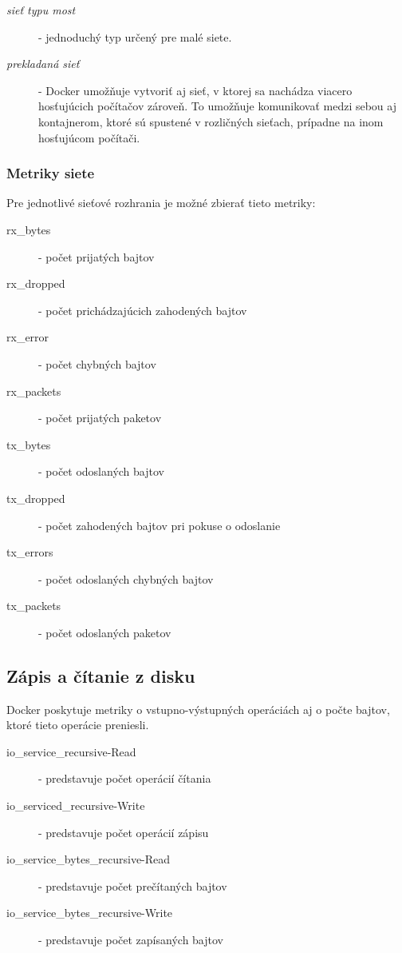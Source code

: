 \documentclass[printed,11pt,twoside,color,cover,table]{fithesis3}
\begin{document}
\begin{description}
\item[\emph{sieť typu most}] - jednoduchý typ určený pre malé siete.
\item[\emph{prekladaná sieť}] - Docker umožňuje vytvoriť aj sieť, v ktorej sa nachádza viacero hosťujúcich počítačov zároveň. To umožňuje 
komunikovať medzi sebou aj kontajnerom, ktoré sú spustené v rozličných sieťach, prípadne na inom hosťujúcom počítači.
\end{description}

\subsubsection{Metriky siete}
Pre jednotlivé sieťové rozhrania je možné zbierať tieto metriky:
\begin{description}
\item[rx\_bytes] - počet prijatých bajtov
\item[rx\_dropped] - počet prichádzajúcich zahodených bajtov
\item[rx\_error] - počet chybných bajtov
\item[rx\_packets] - počet prijatých paketov
\item[tx\_bytes] - počet odoslaných bajtov
\item[tx\_dropped] - počet zahodených bajtov pri pokuse o odoslanie
\item[tx\_errors] - počet odoslaných chybných bajtov
\item[tx\_packets] - počet odoslaných paketov
\end{description}

\subsection{Zápis a čítanie z disku}
Docker poskytuje metriky o vstupno-výstupných operáciách aj o počte bajtov, ktoré tieto operácie preniesli.
\begin{description}
\item[io\_service\_recursive-Read] - predstavuje počet operácií čítania
\item[io\_serviced\_recursive-Write] - predstavuje počet operácií zápisu
\item[io\_service\_bytes\_recursive-Read] - predstavuje počet prečítaných bajtov
\item[io\_service\_bytes\_recursive-Write] - predstavuje počet zapísaných bajtov
\end{description}
\end{document}
